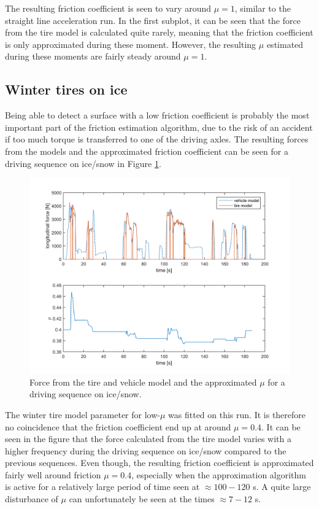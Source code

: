 The resulting friction coefficient is seen to vary around $ \mu = 1 $, similar to the straight line acceleration run. In the first subplot, it can be seen that the force from the tire model is calculated quite rarely, meaning that the friction coefficient is only approximated during these moment. However, the resulting $ \mu $ estimated during these moments are fairly steady around $ \mu = 1 $. 

\subsection{Winter tires on ice}
Being able to detect a surface with a low friction coefficient is probably the most important part of the friction estimation algorithm, due to the risk of an accident if too much torque is transferred to one of the driving axles. The resulting forces from the models and the approximated friction coefficient can be seen for a driving sequence on ice/snow in Figure \ref{force_mue_ice_normal}.

\begin{figure}[h]
	\centering
	\includegraphics[width=1.0\textwidth]{Pictures/force_mue_ice_normal}
	\caption {Force from the tire and vehicle model and the approximated $ \mu $ for a driving sequence on ice/snow.}
	\label{force_mue_ice_normal}
\end{figure}

The winter tire model parameter for low-$ \mu $ was fitted on this run. It is therefore no coincidence that the friction coefficient end up at around $ \mu = 0.4 $. It can be seen in the figure that the force calculated from the tire model varies with a higher frequency during the driving sequence on ice/snow compared to the previous sequences. Even though, the resulting friction coefficient is approximated fairly well around friction $ \mu = 0.4 $, especially when the approximation algorithm is active for a relatively large period of time seen at $ \approx 100-120 $ s. A quite large disturbance of $ \mu $ can unfortunately be seen at the times $ \approx 7 - 12$ s.

